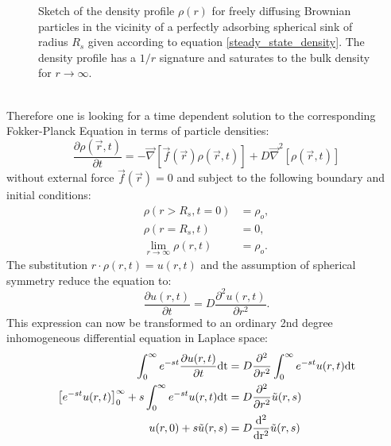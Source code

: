 \begin{minipage}[t]{0.38 \textwidth}
    \begin{figure}[H]
        \caption{Sketch of the density profile $\rho(r)$ for freely diffusing Brownian particles in the vicinity of a perfectly adsorbing spherical sink of radius $R_s$ given according to equation \eqref{steady_state_density}. The density profile has a $1/r$ signature and saturates to the bulk density for $r \rightarrow \infty$.\label{fig:rho_smoluchowski}}
    \end{figure}
\end{minipage}\begin{minipage}[t]{0.62 \textwidth}
    \begin{figure}[H]
         
    \end{figure}
\end{minipage}
\vspace{.3 cm}\\
Therefore one is looking for a time dependent solution to the corresponding Fokker-Planck Equation in terms of particle densities:
\begin{equation}
        \frac{\partial \rho(\vec{r},t)}{\partial t} = - \vec \nabla \left[ \vec f(\vec{r})\rho(\vec{r},t) \right] + D\vec \nabla ^2 \left[\rho(\vec{r},t) \right] 
    \label{FPE3}
\end{equation}
without external force $\vec{f}(\vec{r})=0$ and subject to the following boundary and initial conditions:
\begin{align}
    \rho(r > R_s, t = 0) &= \rho_o, \\
    \rho(r=R_s,t) &= 0, \\
    \lim_{r \rightarrow \infty} \rho(r, t) &= \rho_o.
    \label{BC}
\end{align}
The substitution $r \cdot \rho(r,t) = u(r,t)$ and the assumption of spherical symmetry reduce the equation to:
\begin{equation}
    \frac{\partial u(r,t)}{\partial t} = D \frac{\partial ^2 u(r,t)}{\partial r^2}.
    \label{Simplified FPE}
\end{equation}
This expression can now be transformed to an ordinary 2nd degree inhomogeneous differential equation in Laplace space:
\begin{align}
    \int_0^\infty e^{-st}\frac{\partial u(r,t)}{\partial t} \rm{d} t &= D \frac{\partial ^2 }{\partial r^2} \int_0^\infty e^{-st} u(r,t) \rm{d} t \\
    \left[e^{-st} u(r,t) \right]_0^\infty + s \int_0^\infty e^{-st} u(r,t) \rm{d} t &= D \frac{\partial^2}{\partial r^2} \tilde{u}(r,s)\\
    u(r,0) + s \tilde{u}(r,s) &= D \frac{\rm{d}^2}{\rm{d} r^2} \tilde{u}(r,s)
\end{align}
